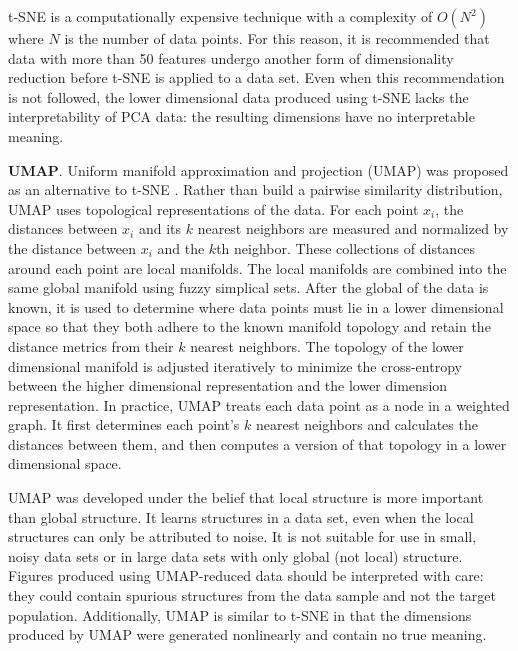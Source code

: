 t-SNE is a computationally expensive technique with a complexity of $O(N^2)$ where $N$ is the number of data points. For this reason, it is recommended that data with more than 50 features undergo another form of dimensionality reduction before t-SNE is applied to a data set. Even when this recommendation is not followed, the lower dimensional data produced using t-SNE lacks the interpretability of PCA data: the resulting dimensions have no interpretable meaning.

\textbf{UMAP}. Uniform manifold approximation and projection (UMAP) was proposed as an alternative to t-SNE \cite{McInnes2018}. Rather than build a pairwise similarity distribution, UMAP uses topological representations of the data. For each point $x_i$, the distances between $x_i$ and its $k$ nearest neighbors are measured and normalized by the distance between $x_i$ and the $k$th neighbor. These collections of distances around each point are local manifolds. The local manifolds are combined into the same global manifold using fuzzy simplical sets. After the global of the data is known, it is used to determine where data points must lie in a lower dimensional space so that they both adhere to the known manifold topology and retain the distance metrics from their $k$ nearest neighbors. The topology of the lower dimensional manifold is adjusted iteratively to minimize the cross-entropy between the higher dimensional representation and the lower dimension representation. In practice, UMAP treats each data point as a node in a weighted graph. It first determines each point's $k$ nearest neighbors and calculates the distances between them, and then computes a version of that topology in a lower dimensional space.

UMAP was developed under the belief that local structure is more important than global structure. It learns structures in a data set, even when the local structures can only be attributed to noise. It is not suitable for use in small, noisy data sets or in large data sets with only global (not local) structure. Figures produced using UMAP-reduced data should be interpreted with care: they could contain spurious structures from the data sample and not the target population. Additionally, UMAP is similar to t-SNE in that the dimensions produced by UMAP were generated nonlinearly and contain no true meaning. 

